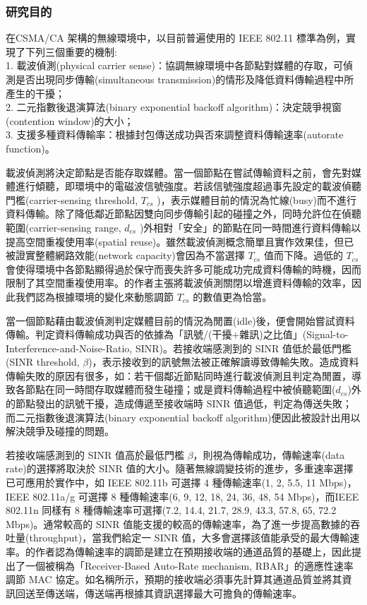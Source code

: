 \documentclass[12pt,a4paper]{article}
\begin{document}
\begin{description}
\subsubsection{研究目的}%

在CSMA/CA 架構的無線環境中，以目前普遍使用的 IEEE 802.11 標準為例，實現了下列三個重要的機制: \\
1. 載波偵測(physical carrier sense)：協調無線環境中各節點對媒體的存取，可偵測是否出現同步傳輸(simultaneous transmission)的情形及降低資料傳輸過程中所產生的干擾；\\
2. 二元指數後退演算法(binary exponential backoff algorithm)：決定競爭視窗(contention window)的大小；\\
3. 支援多種資料傳輸率：根據封包傳送成功與否來調整資料傳輸速率(autorate function)。

載波偵測將決定節點是否能存取媒體。當一個節點在嘗試傳輸資料之前，會先對媒體進行傾聽，即環境中的電磁波信號強度。若該信號強度超過事先設定的載波偵聽門檻(carrier-sensing threshold, $T_{cs}$ )，表示媒體目前的情況為忙線(busy)而不進行資料傳輸。除了降低鄰近節點因雙向同步傳輸引起的碰撞之外，同時允許位在偵聽範圍(carrier-sensing range, $d_{cs}$ )外相對「安全」的節點在同一時間進行資料傳輸以提高空間重複使用率(spatial reuse)。雖然載波偵測概念簡單且實作效果佳，但已被\cite{sigcomm05_rwpcs}證實整體網路效能(network capacity)會因為不當選擇 $T_{cs}$ 值而下降。過低的 $T_{cs}$ 會使得環境中各節點顯得過於保守而喪失許多可能成功完成資料傳輸的時機，因而限制了其空間重複使用率。\cite{sigcomm05_rwpcs}的作者主張將載波偵測關閉以增進資料傳輸的效率，因此我們認為根據環境的變化來動態調節 $T_{cs}$ 的數值更為恰當。

當一個節點藉由載波偵測判定媒體目前的情況為閒置(idle)後，便會開始嘗試資料傳輸。判定資料傳輸成功與否的依據為「訊號/(干擾+雜訊)之比值」(Signal-to-Interference-and-Noise-Ratio, SINR)。若接收端感測到的 SINR 值低於最低門檻(SINR threshold, $\beta$)，表示接收到的訊號無法被正確解讀導致傳輸失敗。造成資料傳輸失敗的原因有很多，如：若干個鄰近節點同時進行載波偵測且判定為閒置，導致各節點在同一時間存取媒體而發生碰撞；或是資料傳輸過程中被偵聽範圍($d_{cs}$)外的節點發出的訊號干擾，造成傳遞至接收端時 SINR 值過低，判定為傳送失敗；而二元指數後退演算法(binary exponential backoff algorithm)便因此被設計出用以解決競爭及碰撞的問題。

若接收端感測到的 SINR 值高於最低門檻 $\beta$，則視為傳輸成功，傳輸速率(data rate)的選擇將取決於 SINR 值的大小。隨著無線調變技術的進步，多重速率選擇已可應用於實作中，如 IEEE 802.11b 可選擇 4 種傳輸速率(1, 2, 5.5, 11 Mbps)，IEEE 802.11a/g 可選擇 8 種傳輸速率(6, 9, 12, 18, 24, 36, 48, 54 Mbps)，而IEEE 802.11n 同樣有 8 種傳輸速率可選擇(7.2, 14.4, 21.7, 28.9, 43.3, 57.8, 65, 72.2 Mbps)。通常較高的 SINR 值能支援的較高的傳輸速率，為了進一步提高數據的吞吐量(throughput)，當我們給定一 SINR 值，大多會選擇該值能承受的最大傳輸速率。\cite{mobicom01_ramp}的作者認為傳輸速率的調節是建立在預期接收端的通道品質的基礎上，因此提出了一個被稱為「Receiver-Based Auto-Rate mechanism, RBAR」的適應性速率調節 MAC 協定。如名稱所示，預期的接收端必須事先計算其通道品質並將其資訊回送至傳送端，傳送端再根據其資訊選擇最大可擔負的傳輸速率。 


\end{description}
\end{document}
